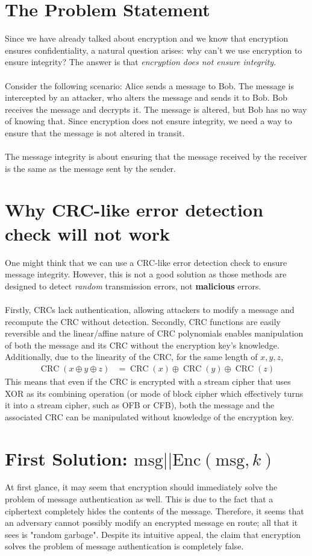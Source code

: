 \documentclass{article}
\begin{document}
\section{The Problem Statement}
Since we have already talked about encryption and we know that encryption ensures confidentiality, a natural question arises: why can't we use encryption to ensure integrity? The answer is that \textit{encryption does not ensure integrity}. \\ \\
Consider the following scenario: Alice sends a message to Bob. The message is intercepted by an attacker, who alters the message and sends it to Bob. Bob receives the message and decrypts it. The message is altered, but Bob has no way of knowing that. Since encryption does not ensure integrity, we need a way to ensure that the message is not altered in transit. \\ \\
The message integrity is about ensuring that the message received by the receiver is the same as the message sent by the sender.
\section{Why CRC-like error detection check will not work}
One might think that we can use a CRC-like error detection check to ensure message integrity. However, this is not a good solution as those methods are designed to detect \textit{random} transmission errors, not \textbf{malicious} errors. \\ \\ Firstly, CRCs lack authentication, allowing attackers to modify a message and recompute the CRC without detection. Secondly, CRC functions are easily reversible and the linear/affine nature of CRC polynomials enables manipulation of both the message and its CRC without the encryption key's knowledge. Additionally, due to the linearity of the CRC, for the same length of $x,y,z$, 
\begin{align*}
    \operatorname{CRC}(x\oplus y\oplus z) &= \operatorname{CRC}(x) \oplus \operatorname{CRC}(y) \oplus \operatorname{CRC}(z)
\end{align*}
This means that even if the CRC is encrypted with a stream cipher that uses XOR as its combining operation (or mode of block cipher which effectively turns it into a stream cipher, such as OFB or CFB), both the message and the associated CRC can be manipulated without knowledge of the encryption key.
\section{First Solution: $\text{msg}||\text{Enc}(\text{msg}, k)$}
At first glance, it may seem that encryption should immediately solve the problem of message authentication as well. This is due to the fact that a ciphertext completely hides the contents of the message. Therefore, it seems that an adversary cannot possibly modify an encrypted message en route; all that it sees is "random garbage". Despite its intuitive appeal, the claim that encryption solves the problem of message authentication is completely false. 
\end{document}
